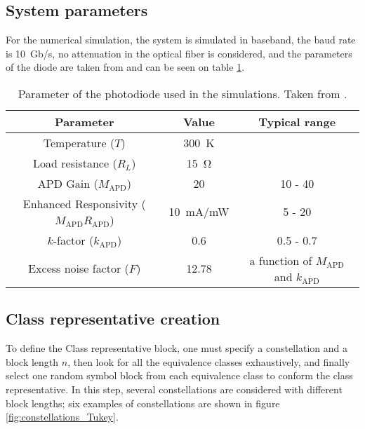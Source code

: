 \subsection{System parameters}

For the numerical simulation, the system is simulated in baseband, the baud rate is \SI{10}{Gb/s}, no attenuation in the optical fiber is considered, and the parameters of the diode are taken from \cite{Tasbihi_Tukey} and can be seen on table \ref{tab:diode_Tukey}.

\begin{table}[htp]
\begin{center}
\begin{tabular}{|c|c|c|}\hline
Parameter&Value&Typical range\\\hline
Temperature ($T$)&\SI{300}{K}&\\\hline
Load resistance ($R_L$)&\SI{15}{\ohm}&\\\hline
APD Gain ($M_\text{APD}$)&20&10 - 40\\\hline
Enhanced Responsivity ($M_\text{APD}R_\text{APD}$)& \SI{10}{\mA/\mW}& 5 - 20\\\hline
$k$-factor ($k_\text{APD}$)&0.6&0.5 - 0.7\\\hline
Excess noise factor ($F$)&12.78&a function of $M_\text{APD}$ and $k_\text{APD}$\\\hline
\end{tabular}
\end{center}
\caption{Parameter of the photodiode used in the simulations. Taken from \cite{Tasbihi_Tukey}.}
\label{tab:diode_Tukey}
\end{table}%

\subsection{Class representative creation}

To define the Class representative block, one must specify a constellation and a block length $n$, then look for all the equivalence classes exhaustively, and finally select one random symbol block from each equivalence class to conform the class representative. In this step, several constellations are considered with different block lengths; six examples of constellations are shown in figure \ref{fig:constellations_Tukey}.

